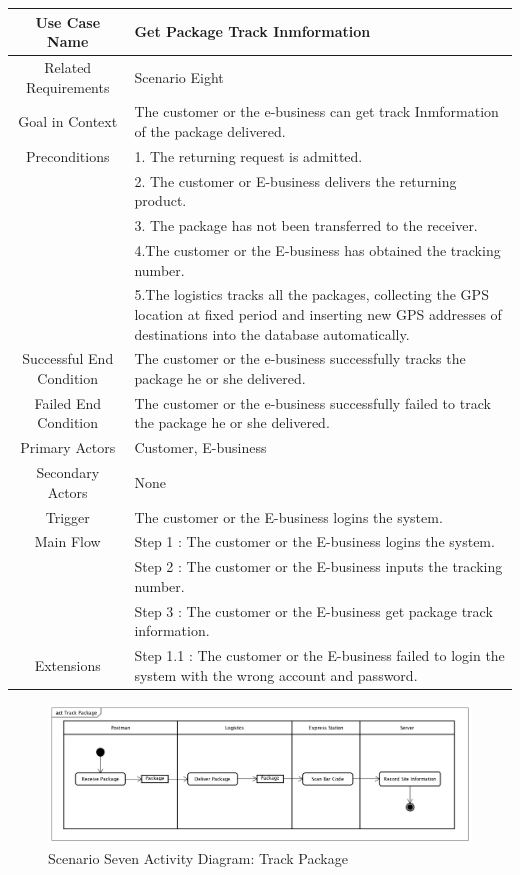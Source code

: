 \documentclass[12pt]{scrreprt}
\begin{document}
\begin{table}
  \centering
  \begin{tabular}{| c | p{11cm} |}
    \hline
    Use Case Name & Get Package Track Inmformation\\
    \hline
    Related Requirements & Scenario Eight\\
    \hline
    Goal in Context & The customer or the e-business can get track Inmformation
    of the package delivered.\\
    \hline
    Preconditions & 1. The returning request is admitted.\\
    & 2. The customer or E-business delivers the returning product.\\
    & 3. The package has not been transferred to the receiver.\\
    & 4.The customer or the E-business has obtained the tracking number.\\
    & 5.The logistics tracks all the packages, collecting the GPS location at
    fixed period and inserting new GPS addresses of destinations into the
    database automatically.\\
    \hline
    Successful End Condition & The customer or the e-business successfully
    tracks the package he or she delivered.\\
    \hline
    Failed End Condition & The customer or the e-business successfully failed
    to track the package he or she delivered.\\
    \hline
    Primary Actors & Customer, E-business\\
    \hline
    Secondary Actors & None\\
    \hline
    Trigger & The customer or the E-business logins the system.\\
    \hline
    Main Flow & Step 1 : The customer or the E-business logins the system.\\
    & Step 2 : The customer or the E-business inputs the tracking number.\\
    & Step 3 : The customer or the E-business get package track information.\\
    \hline
    Extensions & Step 1.1 : The customer or the E-business failed to login the
    system with the wrong account and password.\\
    \hline
  \end{tabular}
\end{table}

\begin{figure}[H]
  \centering\includegraphics[width=5in]{DocumentRes/8TrackPackage.png}
  \caption{Scenario Seven Activity Diagram: Track Package}
\end{figure}
\end{document}
